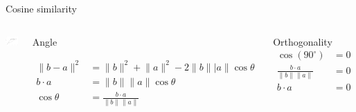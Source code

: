 \documentclass[
  10pt,
  ignorenonframetext,
  x11names, dvipsnames, bibspacing, natbib, table]{beamer}
\begin{document}
\begin{frame}{Cosine similarity}
\protect\hypertarget{cosine-similarity-3}{}
\begin{columns}
    

\begin{center}\includegraphics[width=1\linewidth]{tryOut_files/figure-beamer/cosine4-1} \end{center}




\footnotesize 


\begin{block}{Angle}

\begin{align*}
\lVert b - a \rVert^2 &  = \lVert  b \rVert^2 + \lVert a \rVert^2 - 
  2 \lVert b \rVert   \lvert  a \rVert  \cos \theta  \\
b \cdot a  & = \lVert b\rVert \lVert  a \rVert \cos \theta \\ 
\cos \theta & = \frac{b \cdot a}{\lVert b\rVert  \lVert  a \rVert }
\end{align*}

\end{block}


\pause 

\begin{block}{Orthogonality}
\begin{align*}
\cos ( 90^{\circ}) & = 0 \\ 
\frac{b \cdot a}{\lVert  b\rVert \lVert a \rVert} & = 0\\ 
 b \cdot a & = 0  
\end{align*}
\end{block}







\end{columns}
\end{frame}
\end{document}
